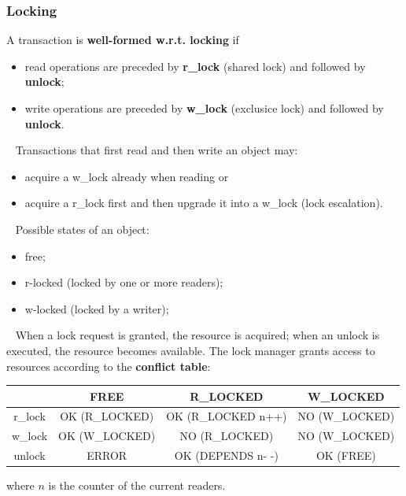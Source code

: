 \subsubsection{Locking}
A transaction is \textbf{well-formed w.r.t. locking} if
\begin{itemize}
    \item read operations are preceded by \textbf{r\_lock} (shared lock) and followed by \textbf{unlock};
    \item write operations are preceded by \textbf{w\_lock} (exclusice lock) and followed by \textbf{unlock}.
\end{itemize}
\ \newline
Transactions that first read and then write an object may:
\begin{itemize}
    \item acquire a w\_lock already when reading or
    \item acquire a r\_lock first and then upgrade it into a w\_lock (lock escalation).
\end{itemize}
\ \newline
Possible states of an object:
\begin{itemize}
    \item free;
    \item r-locked (locked by one or more readers);
    \item w-locked (locked by a writer);
\end{itemize}
\ \newline
When a lock request is granted, the resource is acquired; when an unlock is executed, the resource becomes available.\newline
The lock manager grants access to resources according to the \textbf{conflict table}:
\renewcommand{\arraystretch}{1.5}
\begin{center}
    \begin{tabular}{ |c|c c c| } 
     \hline
     & FREE & R\_LOCKED & W\_LOCKED \\ 
     \hline
     r\_lock & OK (R\_LOCKED) & OK (R\_LOCKED n++) & NO (W\_LOCKED) \\ 
     w\_lock & OK (W\_LOCKED) & NO (R\_LOCKED) & NO (W\_LOCKED)\\ 
     unlock & ERROR & OK (DEPENDS n- -) & OK (FREE) \\ 
     \hline
    \end{tabular}
\end{center}
\renewcommand{\arraystretch}{1}
where $n$ is the counter of the current readers.
